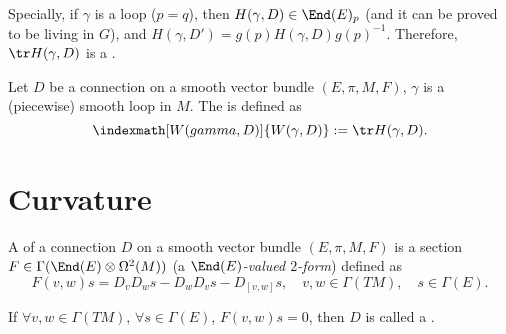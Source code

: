\documentclass[openany, oneside, a5paper]{book}
\begin{document}
Specially, if $\gamma$ is a loop ($p = q$), then $H(\gamma, D) \in \End(E)_p$ (and it can be proved to be living in $G$), and $H(\gamma, D') = g(p) H(\gamma, D) g(p)^{-1}$.
Therefore, $\tr H(\gamma, D)$ is a .

\begin{definition}
    Let $D$ be a connection on a smooth vector bundle $(E, \pi, M, F)$, $\gamma$ is a (piecewise) smooth loop in $M$.
    The  is defined as 
    \begin{equation}
        \indexmath[W(gamma, D)]{W(\gamma, D)} := \tr H(\gamma, D).
    \end{equation}
\end{definition}

\chapter{Curvature}

\begin{definition}[Curvature]
    A  of a connection $D$ on a smooth vector bundle $(E, \pi, M, F)$ is a section $F \in \Gamma(\End(E) \otimes \Omega^2(M))$ (a \emph{$\End(E)$-valued $2$-form}) defined as
    \begin{equation}
        F(v, w) s = D_v D_w s - D_w D_v s - D_{[v, w]} s,
        \quad
        v, w \in \Gamma(TM),
        \quad
        s \in \Gamma(E).
    \end{equation} 
\end{definition}

If $\forall v, w \in \Gamma(TM)$, $\forall s \in \Gamma(E)$, $F(v, w) s = 0$, then $D$ is called a .
\end{document}
